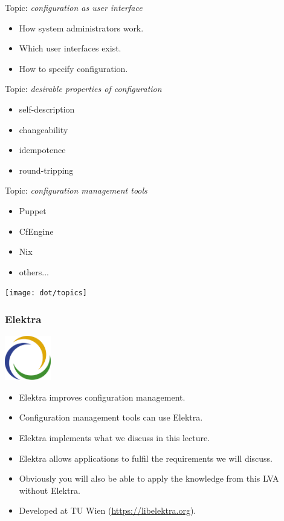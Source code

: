 \documentclass{beamer}
\begin{document}
\begin{frame}
	Topic: \textit{configuration as user interface}
	\begin{itemize}
		\item How system administrators work.
		\item Which user interfaces exist.
		\item How to specify configuration.
	\end{itemize}
\end{frame}

\begin{frame}
	Topic: \textit{desirable properties of configuration}
	\begin{itemize}
		\item self-description
		\item changeability
		\item idempotence
		\item round-tripping
	\end{itemize}
\end{frame}

\begin{frame}
	Topic: \textit{configuration management tools}
	\begin{itemize}
		\item Puppet
		\item CfEngine
		\item Nix
		\item others...
	\end{itemize}
\end{frame}


\begin{frame}
	\hspace*{-1cm}\texttt{[image: dot/topics]}
\end{frame}

\begin{frame}
	\frametitle{Elektra}
	\hfill \includegraphics[width=2cm]{../figures/logo}
	\vspace{-1cm}
	\begin{itemize}
		\item Elektra improves configuration management.
		\item Configuration management tools can use Elektra.
		\item Elektra implements what we discuss in this lecture.
		\item Elektra allows applications to fulfil the requirements we will discuss.
		\item Obviously you will also be able to apply the knowledge from this LVA without Elektra.
		\item Developed at TU Wien (\url{https://libelektra.org}).
	\end{itemize}
\end{frame}
\end{document}
